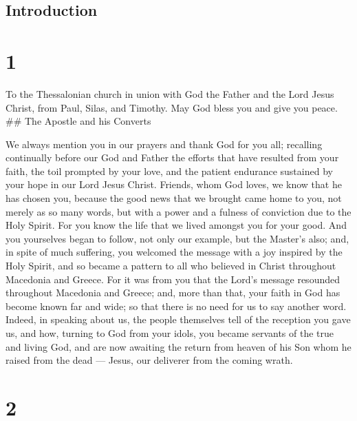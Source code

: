 \hypertarget{introduction}{%
\subsection{Introduction}\label{introduction}}

\hypertarget{section}{%
\section{1}\label{section}}

 To the Thessalonian church in union with God the Father and
the Lord Jesus Christ, from Paul, Silas, and Timothy. May God bless you
and give you peace. \#\# The Apostle and his Converts

 We always mention you in our prayers and thank God for you
all;  recalling continually before our God and Father the
efforts that have resulted from your faith, the toil prompted by your
love, and the patient endurance sustained by your hope in our Lord Jesus
Christ.  Friends, whom God loves, we know that he has chosen
you,  because the good news that we brought came home to
you, not merely as so many words, but with a power and a fulness of
conviction due to the Holy Spirit. For you know the life that we lived
amongst you for your good.  And you yourselves began to
follow, not only our example, but the Master's also; and, in spite of
much suffering, you welcomed the message with a joy inspired by the Holy
Spirit,  and so became a pattern to all who believed in
Christ throughout Macedonia and Greece.  For it was from you
that the Lord's message resounded throughout Macedonia and Greece; and,
more than that, your faith in God has become known far and wide; so that
there is no need for us to say another word.  Indeed, in
speaking about us, the people themselves tell of the reception you gave
us, and how, turning to God from your idols, you became servants of the
true and living God,  and are now awaiting the return from
heaven of his Son whom he raised from the dead --- Jesus, our deliverer
from the coming wrath.

\hypertarget{section-1}{%
\section{2}\label{section-1}}

